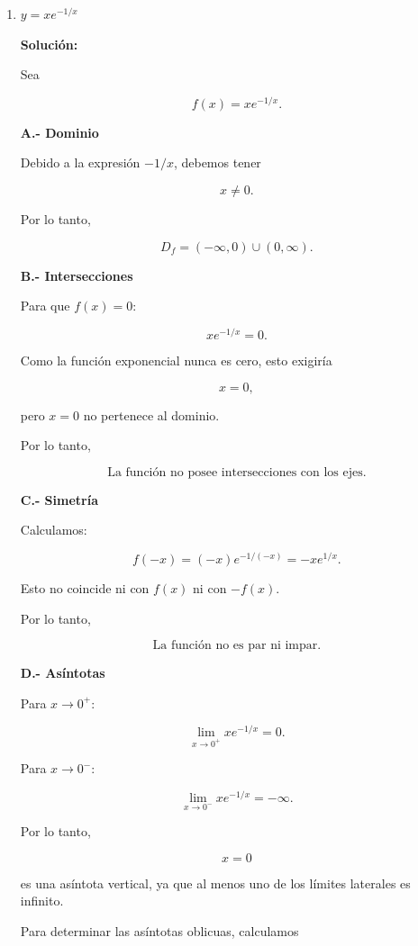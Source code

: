 \documentclass[12pt]{article}
\newcommand{\solucion}{%
    \vspace{0.8em}%
    \textbf{Solución:}%
}
\begin{document}
\begin{enumerate}[label=\alph*.-]
    \vspace{1cm}


\setcounter{enumi}{7} %

\item $y = xe^{-1/x}$

\solucion

Sea

\[
f(x)=xe^{-1/x}.
\]

\textbf{A.- Dominio}

Debido a la expresión $-1/x$, debemos tener

\[
x\neq0.
\]

Por lo tanto,

\[
\boxed{
D_f=(-\infty,0)\cup(0,\infty)
}.
\]

\textbf{B.- Intersecciones}

Para que $f(x)=0$:

\[
xe^{-1/x}=0.
\]

Como la función exponencial nunca es cero, esto exigiría

\[
x=0,
\]

pero $x=0$ no pertenece al dominio.

Por lo tanto,

\[
\boxed{\text{La función no posee intersecciones con los ejes.}}
\]

\textbf{C.- Simetría}

Calculamos:

\[
f(-x)
=
(-x)e^{-1/(-x)}
=
-xe^{1/x}.
\]

Esto no coincide ni con $f(x)$ ni con $-f(x)$.

Por lo tanto,

\[
\boxed{\text{La función no es par ni impar.}}
\]

\textbf{D.- Asíntotas}

Para $x\to0^+$:

\[
\lim_{x\to0^+}xe^{-1/x}=0.
\]

Para $x\to0^-$:

\[
\lim_{x\to0^-}xe^{-1/x}=-\infty.
\]

Por lo tanto,

\[
\boxed{x=0}
\]

es una asíntota vertical, ya que al menos uno de los
límites laterales es infinito.

Para determinar las asíntotas oblicuas, calculamos


\end{enumerate}
\end{document}
